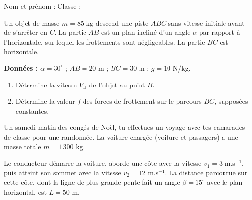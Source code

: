 \newcommand{\matiere}{Physique : théorème de l'énergie cinétique}




\vspace{2pt}
Nom et prénom : \dotfill \quad Classe : \dotfill

\begin{minipage}[t]{0.56\textwidth}
\vspace{0pt}
Un objet de masse $m = 85$ kg descend une piste $ABC$ sans vitesse initiale avant de s'arrêter
en $C$. La partie $AB$ est un plan incliné d'un angle $\alpha$ par rapport à l'horizontale, sur
lequel les frottements sont négligeables. La partie $BC$ est horizontale.

\textbf{Données :} $\alpha = 30^\circ$ ; $AB = 20$ m ; $BC = 30$ m ; $g = 10$ N/kg.
\end{minipage}\hfill
\begin{minipage}[t]{0.40\textwidth}
\vspace{4pt}
\centering
{}
\end{minipage}

\begin{enumerate}
  \item Détermine la vitesse $V_B$ de l'objet au point $B$.
  \item Détermine la valeur $f$ des forces de frottement sur le parcours $BC$, supposées constantes.
\end{enumerate}

Un samedi matin des congés de Noël, tu effectues un voyage avec tes camarades de classe pour une
randonnée. La voiture chargée (voiture et passagers) a une masse totale $m = 1\,300$ kg.

Le conducteur démarre la voiture, aborde une côte avec la vitesse $v_1 = 3$ m.s$^{-1}$, puis atteint
son sommet avec la vitesse $v_2 = 12$ m.s$^{-1}$. La distance parcourue sur cette côte, dont la
ligne de plus grande pente fait un angle $\beta = 15^\circ$ avec le plan horizontal, est $L = 50$ m.

